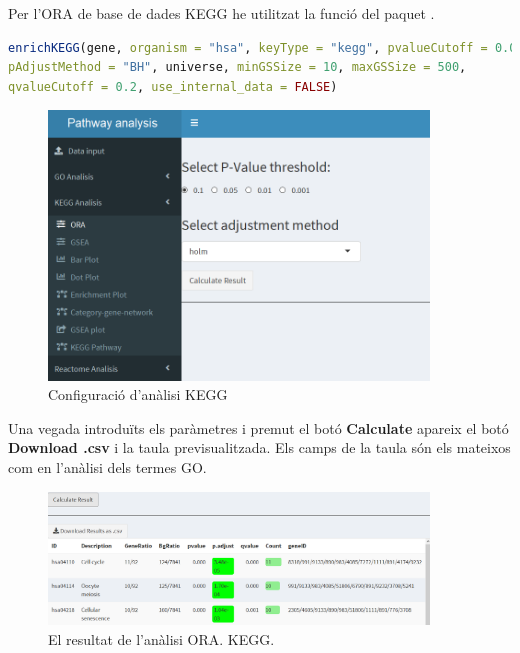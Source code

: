 \documentclass[]{article}
\begin{document}
Per l'ORA de base de dades KEGG he utilitzat la funció  del paquet . 

\begin{lstlisting}[language=R]
enrichKEGG(gene, organism = "hsa", keyType = "kegg", pvalueCutoff = 0.05, 
pAdjustMethod = "BH", universe, minGSSize = 10, maxGSSize = 500, 
qvalueCutoff = 0.2, use_internal_data = FALSE)
\end{lstlisting}



\begin{figure}[H]
\centering
\includegraphics[width=0.9\textwidth]{App_F7_Items_KEGG_ORA.png} 
\caption{Configuració d'anàlisi KEGG}
\end{figure}



Una vegada introduïts els paràmetres i premut el botó \textbf{Calculate} apareix el botó \textbf{Download .csv} i la taula previsualitzada. Els camps de la taula són els mateixos com en l'anàlisi dels termes GO.
\begin{figure}[H]
\centering
\includegraphics[width=0.9\textwidth]{App_F9_Items_KEGG_ORA_Table.png} 
\caption{El resultat de l'anàlisi ORA. KEGG.}
\end{figure}
\end{document}
